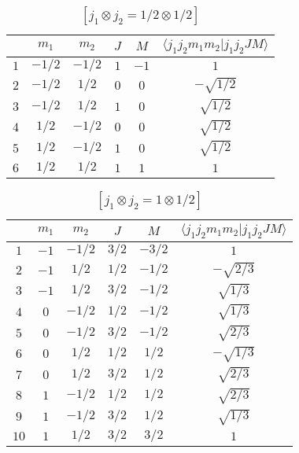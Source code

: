 
\begin{table}
\tiny
\caption{$[j_1 \otimes j_2 = 1/2 \otimes 1/2]$}
\begin{center}
\begin{tabular}{|c|c|c|c|c|c|}
\hline 
   & $m_1$ & $m_2$ & $J$ & $M$ & $\langle j_1 j_2 m_1 m_2 | j_1 j_2 J M \rangle$ \\ 
\hline 
$1$ & $-1/2$ & $-1/2$ & $1$ & $-1$ & $1$ \\ 
$2$ & $-1/2$ & $1/2$ & $0$ & $0$ & $-\sqrt{1/2}$ \\ 
$3$ & $-1/2$ & $1/2$ & $1$ & $0$ & $\sqrt{1/2}$ \\ 
$4$ & $1/2$ & $-1/2$ & $0$ & $0$ & $\sqrt{1/2}$ \\ 
$5$ & $1/2$ & $-1/2$ & $1$ & $0$ & $\sqrt{1/2}$ \\ 
$6$ & $1/2$ & $1/2$ & $1$ & $1$ & $1$ \\ 
\hline 
\end{tabular}
\end{center}
\end{table}

\begin{table}
\tiny
\caption{$[j_1 \otimes j_2 = 1 \otimes 1/2]$}
\begin{center}
\begin{tabular}{|c|c|c|c|c|c|}
\hline 
   & $m_1$ & $m_2$ & $J$ & $M$ & $\langle j_1 j_2 m_1 m_2 | j_1 j_2 J M \rangle$ \\ 
\hline 
$1$ & $-1$ & $-1/2$ & $3/2$ & $-3/2$ & $1$ \\ 
$2$ & $-1$ & $1/2$ & $1/2$ & $-1/2$ & $-\sqrt{2/3}$ \\ 
$3$ & $-1$ & $1/2$ & $3/2$ & $-1/2$ & $\sqrt{1/3}$ \\ 
$4$ & $0$ & $-1/2$ & $1/2$ & $-1/2$ & $\sqrt{1/3}$ \\ 
$5$ & $0$ & $-1/2$ & $3/2$ & $-1/2$ & $\sqrt{2/3}$ \\ 
$6$ & $0$ & $1/2$ & $1/2$ & $1/2$ & $-\sqrt{1/3}$ \\ 
$7$ & $0$ & $1/2$ & $3/2$ & $1/2$ & $\sqrt{2/3}$ \\ 
$8$ & $1$ & $-1/2$ & $1/2$ & $1/2$ & $\sqrt{2/3}$ \\ 
$9$ & $1$ & $-1/2$ & $3/2$ & $1/2$ & $\sqrt{1/3}$ \\ 
$10$ & $1$ & $1/2$ & $3/2$ & $3/2$ & $1$ \\ 
\hline 
\end{tabular}
\end{center}
\end{table}

